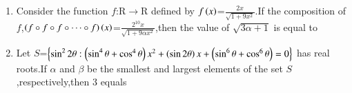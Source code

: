 \documentclass[journal]{IEEEtran}
\begin{document}
\begin{enumerate}[start=16]
    \item Consider the function $f$:R$\to$R defined by $f\left(x\right)$=$\frac{2x}{\sqrt{1+9x^2}}$.If the composition of $f$,$\left(f\circ f\circ f\circ \dots \circ f\right)\left(x\right)$=$\frac{2^{10}x}{\sqrt{1+9\alpha x^2}}$,then the value of $\sqrt{3\alpha+1}$ is equal to
    \item Let $S$=$\left\{\sin^2{2\theta}:\left(\sin^4{\theta}+\cos^4{\theta}\right)x^2+\left(\sin{2\theta}\right)x+\left(\sin^6{\theta}+\cos^6{\theta}\right)=0\right\}$ has real roots.If $\alpha$ and $\beta$ be the smallest and largest elements of the set $S$,respectively,then 3 equals
\end{enumerate}
\end{document}
